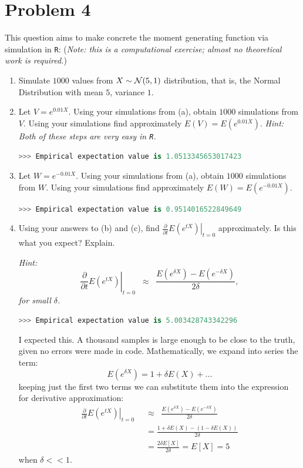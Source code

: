 \documentclass{article}
\newcommand{\1}{\mathbf{1}}
\begin{document}
\section*{Problem 4}
This question aims to make concrete the moment generating function via simulation in {\tt R}: ({\it Note: this is a computational exercise; almost no theoretical work is required.})
\begin{enumerate}
    \item Simulate $1000$ values from $X \sim {\cal N}(5,1)$ distribution, that is, the Normal Distribution with mean $5$, variance $1$.
    
    
    
    
    \item Let $V = e^{0.01 X}$. Using your simulations from (a), obtain $1000$ simulations from $V$. Using your simulations find approximately $E(V) = E(e^{0.01 X})$. {\it Hint: Both of these steps are very easy in {\tt R}.}
    
    
    \lstinline[language=Python]{>>> Empirical expectation value is 1.0513345653017423}
    
    \item Let $W = e^{-0.01 X}$. Using your simulations from (a), obtain $1000$ simulations from $W$. Using your simulations find approximately $E(W) = E(e^{-0.01 X})$.
    
    
     \lstinline[language=Python]{>>> Empirical expectation value is 0.9514016522849649}
    
    \item Using your answers to (b) and (c), find $ \left. \frac{\partial}{\partial t} E(e^{tX}) \right|_{t=0}$ approximately. Is this what you expect? Explain.\par
    {\it Hint:  $$ \left. \frac{\partial}{\partial t} E(e^{tX}) \right|_{t=0}\;\; \approx\;\; \frac{ E(e^{\delta X}) - E(e^{-\delta X})}{2\delta},$$ for small $\delta$.}
        
        
         \lstinline[language=Python]{>>> Empirical expectation value is 5.003428743342296}
         
         I expected this. A thousand samples is large enough to be close to the truth, given no errors were made in code. Mathematically, we expand into series the term:
         $$E(e^{\delta X}) = 1 + \delta E(X) + ... $$
         keeping just the first two terms we can substitute them into the expression for derivative approximation:
         \begin{align*}
          \left. \frac{\partial}{\partial t} E(e^{tX}) \right|_{t=0}\;\; &\approx\;\; \frac{ E(e^{\delta X}) - E(e^{-\delta X})}{2\delta} \\
            &= \frac{1 + \delta E(X)  - (1 - \delta E(X))}{2\delta} \\
            &= \frac{2\delta E[X]}{2\delta} = E[X] = 5
        \end{align*}
         when $\delta<<1$.
         
\end{enumerate}
\end{document}
